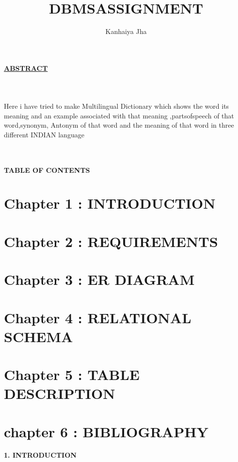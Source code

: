 \documentclass{article}
\title{DBMS\textunderscore ASSIGNMENT}
\author{Kanhaiya Jha}
\date{}
\begin{document}
\maketitle

\textbf{\huge \underline{ABSTRACT}} \\
\\
\\
\\


{\huge Here i have tried to make Multilingual  Dictionary which shows the word its meaning  and an example associated with that meaning ,partsofspeech of that word,synonym,
Antonym of that word and the meaning of that word in three different INDIAN language }\pagebreak

\hline\hspace{20  cm}\\
\\
\textbf{\huge TABLE OF CONTENTS} 
\section{Chapter 1 : INTRODUCTION}
\section{Chapter 2 : REQUIREMENTS}
\section{Chapter 3 : ER DIAGRAM}
\section{Chapter 4 : RELATIONAL  SCHEMA}
\section{Chapter 5 : TABLE DESCRIPTION}
\section{chapter 6 : BIBLIOGRAPHY}
\pagebreak
\hline\hspace{20  cm}
\textbf{\huge 1. INTRODUCTION}\\
\end{document}
